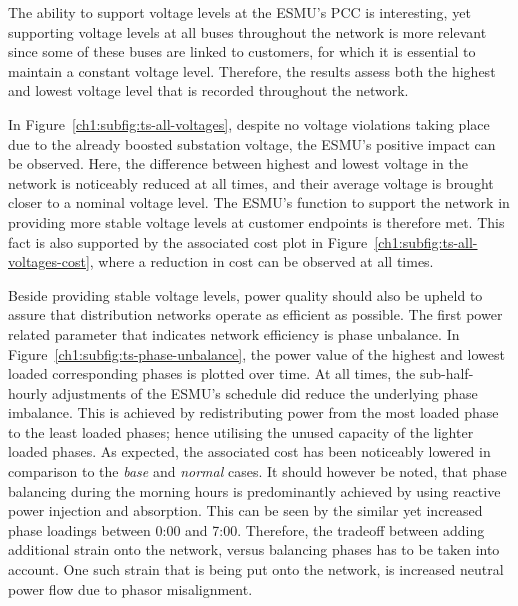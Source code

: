 The ability to support voltage levels at the ESMU's PCC is interesting, yet supporting voltage levels at all buses throughout the network is more relevant since some of these buses are linked to customers, for which it is essential to maintain a constant voltage level.
Therefore, the results assess both the highest and lowest voltage level that is recorded throughout the network.



In Figure~\ref{ch1:subfig:ts-all-voltages}, despite no voltage violations taking place due to the already boosted substation voltage, the ESMU's positive impact can be observed.
Here, the difference between highest and lowest voltage in the network is noticeably reduced at all times, and their average voltage is brought closer to a nominal voltage level.
The ESMU's function to support the network in providing more stable voltage levels at customer endpoints is therefore met.
This fact is also supported by the associated cost plot in Figure~\ref{ch1:subfig:ts-all-voltages-cost}, where a reduction in cost can be observed at all times.




Beside providing stable voltage levels, power quality should also be upheld to assure that distribution networks operate as efficient as possible.
The first power related parameter that indicates network efficiency is phase unbalance.
In Figure~\ref{ch1:subfig:ts-phase-unbalance}, the power value of the highest and lowest loaded corresponding phases is plotted over time.
At all times, the sub-half-hourly adjustments of the ESMU's schedule did reduce the underlying phase imbalance.
This is achieved by redistributing power from the most loaded phase to the least loaded phases; hence utilising the unused capacity of the lighter loaded phases.
As expected, the associated cost has been noticeably lowered in comparison to the \textit{base} and \textit{normal} cases.
It should however be noted, that phase balancing during the morning hours is predominantly achieved by using reactive power injection and absorption.
This can be seen by the similar yet increased phase loadings between 0:00 and 7:00.
Therefore, the tradeoff between adding additional strain onto the network, versus balancing phases has to be taken into account.
One such strain that is being put onto the network, is increased neutral power flow due to phasor misalignment.




